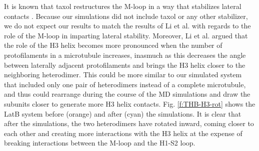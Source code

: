 \documentclass[11pt]{report}
\begin{document}
 It is known that taxol restructures the M-loop in a way that stabilizes lateral contacts \cite{Li2002,Nogales1999,Snyder2001,Amos1999}. Because our simulations did not include taxol or any other stabilizer, we do not expect our results to match the results of Li et al.
\cite{Li2002} with regards to the role of the M-loop in imparting lateral stability. Moreover, Li et al. argued that the role of the H3 helix becomes more pronounced when the number of protofilaments in a microtubule increases, inasmuch as this decreases the angle between laterally adjacent protofilaments and brings the H3 helix closer to the neighboring heterodimer. This could be more similar to our simulated system that included only one pair of heterodimers instead of a complete microtubule, and thus could rearrange during the course of the MD simulations and draw the subunits closer to generate more H3 helix contacts. 
Fig. \ref{f:THB-H3-rot}
shows the LatB system before (orange) and after (cyan) the simulations.
It is clear that after the simulations, the two heterodimers
have rotated inward, coming closer to each other and creating more interactions with the H3 helix at the expense of breaking interactions between the M-loop and the H1-S2 loop. 
\end{document}
